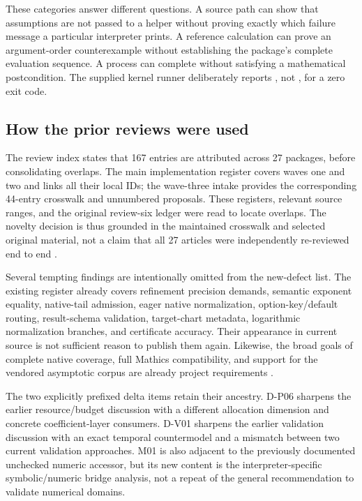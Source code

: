 \documentclass[11pt,a4paper]{article}
\newcommand{\code}[1]{\texttt{\detokenize{#1}}}
\theoremstyle{remark}
\begin{document}
These categories answer different questions. A source path can show that assumptions are not passed to a helper without proving exactly which failure message a particular interpreter prints. A reference calculation can prove an argument-order counterexample without establishing the package's complete evaluation sequence. A process can complete without satisfying a mathematical postcondition. The supplied kernel runner deliberately reports \code{Completed}, not \code{Success}, for a zero exit code.

\subsection{How the prior reviews were used}

The review index states that 167 entries are attributed across 27 packages, before consolidating overlaps. The main implementation register covers waves one and two and links all their local IDs; the wave-three intake provides the corresponding 44-entry crosswalk and unnumbered proposals. These registers, relevant source ranges, and the original review-six ledger were read to locate overlaps. The novelty decision is thus grounded in the maintained crosswalk and selected original material, not a claim that all 27 articles were independently re-reviewed end to end \cite{reviewindex,status,intake,r6ledger}.

Several tempting findings are intentionally omitted from the new-defect list. The existing register already covers refinement precision demands, semantic exponent equality, native-tail admission, eager native normalization, option-key/default routing, result-schema validation, target-chart metadata, logarithmic normalization branches, and certificate accuracy. Their appearance in current source is not sufficient reason to publish them again. Likewise, the broad goals of complete native coverage, full Mathics compatibility, and support for the vendored asymptotic corpus are already project requirements \cite{status,intake}.

The two explicitly prefixed delta items retain their ancestry. D-P06 sharpens the earlier resource/budget discussion with a different allocation dimension and concrete coefficient-layer consumers. D-V01 sharpens the earlier validation discussion with an exact temporal countermodel and a mismatch between two current validation approaches. M01 is also adjacent to the previously documented unchecked numeric accessor, but its new content is the interpreter-specific symbolic/numeric bridge analysis, not a repeat of the general recommendation to validate numerical domains.
\end{document}
